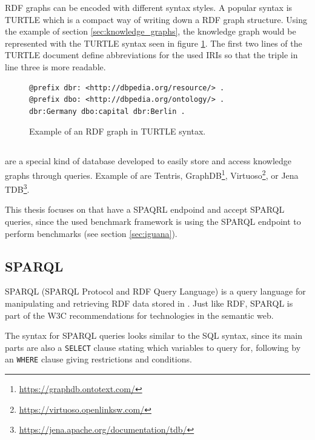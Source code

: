 RDF graphs can be encoded with different syntax styles.
A popular syntax is TURTLE \cite{RDFTurtle} which is a compact way of writing down a RDF graph structure.
Using the example of section \ref{sec:knowledge_graphs}, the knowledge graph would be represented with the TURTLE syntax seen in figure \ref{fig:rdf_turtle}.
The first two lines of the TURTLE document define abbreviations for the used IRIs so that the triple in line three is more readable.

\begin{figure}[tbph]
	\begin{lstlisting}
@prefix dbr: <http://dbpedia.org/resource/> .
@prefix dbo: <http://dbpedia.org/ontology/> .
dbr:Germany dbo:capital dbr:Berlin .
	\end{lstlisting}
	\caption{Example of an RDF graph in TURTLE syntax.}
	\label{fig:rdf_turtle}
\end{figure}


\subsection{\ts{}}
\label{sec:triplestores}
\tsp{} are a special kind of database developed to easily store and access knowledge graphs through queries.
Example of \tsp{} are Tentris\cite{bigerlTentrisTensorBasedTriple2020}, GraphDB\footnote{\url{https://graphdb.ontotext.com/}}, Virtuoso\footnote{\url{https://virtuoso.openlinksw.com/}}, or Jena TDB\footnote{\url{https://jena.apache.org/documentation/tdb/}}.

This thesis focuses on \tsp{} that have a SPAQRL endpoind and accept SPARQL queries, since the used benchmark framework \iguana{} is using the SPARQL endpoint to perform benchmarks (see section \ref{sec:iguana}).


\subsection{SPARQL}
\label{sec:sparql}
SPARQL (SPARQL Protocol and RDF Query Language)\cite{harrisSPARQLQueryLanguage} is a query language for manipulating and retrieving RDF data stored in \tsp{}.
Just like RDF, SPARQL is part of the W3C recommendations for technologies in the semantic web.

The syntax for SPARQL queries looks similar to the SQL syntax, since its main parts are also a \texttt{SELECT} clause stating which variables to query for, following by an \texttt{WHERE} clause giving restrictions and conditions.

